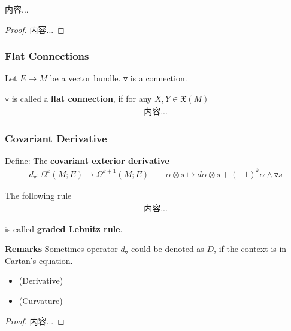 \documentclass[Total.tex]{subfiles}
\begin{document}
			\begin{proposition}
				内容...
			\end{proposition}
			\begin{proof}
				内容...
			\end{proof}
			
		\subsubsection{Flat Connections}
		\begin{Def}
			Let $E\rightarrow M$ be a vector bundle. $\triangledown$ is a connection.
			
			$\triangledown$ is called a \textbf{flat connection}, if for any $X,Y\in \mathfrak{X}(M)$ 
			\begin{gather*}
				内容...
			\end{gather*}
		\end{Def}
			\subsubsection{Covariant Derivative}
			\begin{Def}
				Define: The \textbf{covariant exterior derivative}
				\begin{gather*}
					d_\triangledown:\Omega^k(M;E)\rightarrow \Omega^{k+1}(M;E)\qquad \alpha\otimes s\mapsto d\alpha \otimes s+(-1)^k \alpha\wedge \triangledown s
				\end{gather*}
			\end{Def}
			
			The following rule
			\begin{gather*}
				内容...
			\end{gather*}
			
			is called \textbf{graded Lebnitz rule}.
			
			\textbf{Remarks} Sometimes operator $d_\triangledown$ could be denoted as $D$, if the context is in Cartan's equation. 
			
			\begin{proposition}
				\begin{itemize}
					\item (Derivative)
					\item (Curvature)
				\end{itemize}
			\end{proposition}
			\begin{proof}
				内容...
			\end{proof}
			
\end{document}
